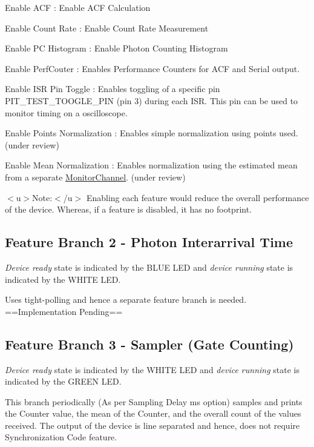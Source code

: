 \begin{DoxyItemize}
\item {\ttfamily Enable A\+CF} \+: Enable A\+CF Calculation
\item {\ttfamily Enable Count Rate} \+: Enable Count Rate Measurement
\item {\ttfamily Enable PC Histogram} \+: Enable Photon Counting Histogram
\item {\ttfamily Enable Perf\+Couter} \+: Enables Performance Counters for A\+CF and Serial output.
\item {\ttfamily Enable I\+SR Pin Toggle} \+: Enables toggling of a specific pin {\ttfamily P\+I\+T\+\_\+\+T\+E\+S\+T\+\_\+\+T\+O\+O\+G\+L\+E\+\_\+\+P\+IN} (pin 3) during each I\+SR. This pin can be used to monitor timing on a oscilloscope.
\item {\ttfamily Enable Points Normalization} \+: Enables simple normalization using points used. (under review)
\item {\ttfamily Enable Mean Normalization} \+: Enables normalization using the estimated mean from a separate {\ttfamily \hyperlink{classMonitorChannel}{Monitor\+Channel}}. (under review)

$<$u$>$Note\+:$<$/u$>$ Enabling each feature would reduce the overall performance of the device. Whereas, if a feature is disabled, it has no footprint.
\end{DoxyItemize}

\subsection*{Feature Branch 2 -\/ {\ttfamily Photon Interarrival Time}}

{\itshape Device ready} state is indicated by the {\ttfamily B\+L\+UE L\+ED} and {\itshape device running} state is indicated by the {\ttfamily W\+H\+I\+TE L\+ED}.

Uses tight-\/polling and hence a separate feature branch is needed. ==Implementation Pending==

\subsection*{Feature Branch 3 -\/ {\ttfamily Sampler} (Gate Counting)}

{\itshape Device ready} state is indicated by the {\ttfamily W\+H\+I\+TE L\+ED} and {\itshape device running} state is indicated by the {\ttfamily G\+R\+E\+EN L\+ED}.

This branch periodically (As per {\ttfamily Sampling Delay ms} option) samples and prints the Counter value, the mean of the Counter, and the overall count of the values received. The output of the device is line separated and hence, does not require {\ttfamily Synchronization Code} feature.

